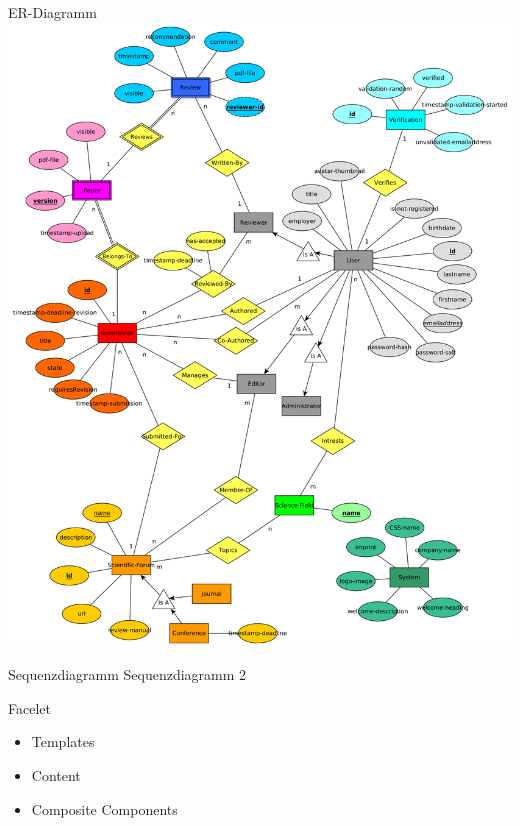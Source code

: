 \documentclass{beamer}
\begin{document}
    \begin{frame}{ER-Diagramm}
        \centering
        \includegraphics[height=0.9\textheight]{../../docs/Entwurf/graphics/ER-Modell.png}
    \end{frame}

    \begin{frame}{Sequenzdiagramm}
        \centering
        Sequenzdiagramm 2
    \end{frame}

    \begin{frame}{Facelet}
        \begin{itemize}
            \item Templates
            \item Content
            \item Composite Components
        \end{itemize}
    \end{frame}
\end{document}
